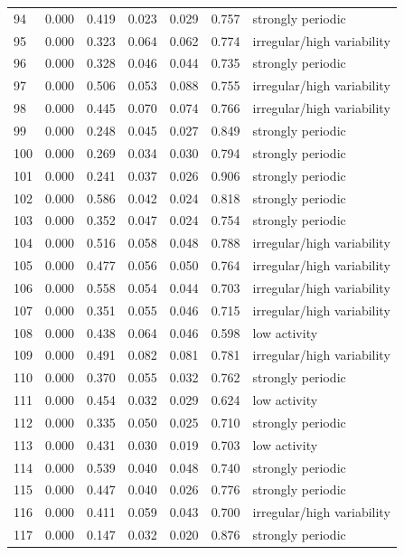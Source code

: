 \begin{longtable}{lrrrrrl}
94 & 0.000 & 0.419 & 0.023 & 0.029 & 0.757 & strongly periodic \\
95 & 0.000 & 0.323 & 0.064 & 0.062 & 0.774 & irregular/high variability \\
96 & 0.000 & 0.328 & 0.046 & 0.044 & 0.735 & strongly periodic \\
97 & 0.000 & 0.506 & 0.053 & 0.088 & 0.755 & irregular/high variability \\
98 & 0.000 & 0.445 & 0.070 & 0.074 & 0.766 & irregular/high variability \\
99 & 0.000 & 0.248 & 0.045 & 0.027 & 0.849 & strongly periodic \\
100 & 0.000 & 0.269 & 0.034 & 0.030 & 0.794 & strongly periodic \\
101 & 0.000 & 0.241 & 0.037 & 0.026 & 0.906 & strongly periodic \\
102 & 0.000 & 0.586 & 0.042 & 0.024 & 0.818 & strongly periodic \\
103 & 0.000 & 0.352 & 0.047 & 0.024 & 0.754 & strongly periodic \\
104 & 0.000 & 0.516 & 0.058 & 0.048 & 0.788 & irregular/high variability \\
105 & 0.000 & 0.477 & 0.056 & 0.050 & 0.764 & irregular/high variability \\
106 & 0.000 & 0.558 & 0.054 & 0.044 & 0.703 & irregular/high variability \\
107 & 0.000 & 0.351 & 0.055 & 0.046 & 0.715 & irregular/high variability \\
108 & 0.000 & 0.438 & 0.064 & 0.046 & 0.598 & low activity \\
109 & 0.000 & 0.491 & 0.082 & 0.081 & 0.781 & irregular/high variability \\
110 & 0.000 & 0.370 & 0.055 & 0.032 & 0.762 & strongly periodic \\
111 & 0.000 & 0.454 & 0.032 & 0.029 & 0.624 & low activity \\
112 & 0.000 & 0.335 & 0.050 & 0.025 & 0.710 & strongly periodic \\
113 & 0.000 & 0.431 & 0.030 & 0.019 & 0.703 & low activity \\
114 & 0.000 & 0.539 & 0.040 & 0.048 & 0.740 & strongly periodic \\
115 & 0.000 & 0.447 & 0.040 & 0.026 & 0.776 & strongly periodic \\
116 & 0.000 & 0.411 & 0.059 & 0.043 & 0.700 & irregular/high variability \\
117 & 0.000 & 0.147 & 0.032 & 0.020 & 0.876 & strongly periodic \\

\end{longtable}

